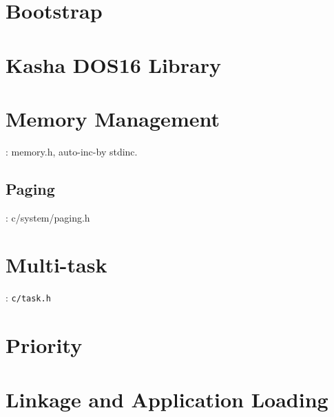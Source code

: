 

\section{Bootstrap}


\section{Kasha DOS16 Library}


\section{Memory Management}
: memory.h, auto-inc-by stdinc.

\subsection{Paging}

: c/system/paging.h

\section{Multi-task}
: \verb|c/task.h|

\section{Priority}






\section{Linkage and Application Loading}


